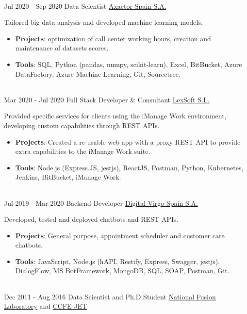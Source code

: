 \documentclass[letterpaper]{twentysecondcv} %
\begin{document}
\begin{twenty}
{\begin{itemize}
        \end{itemize}}
        \\
    \twentyitem
    	{Jul 2020 -}
		{Sep 2020}
        {Data Scientist}
        {\href{https://www.axactor.com/}{Axactor Spain S.A.}}
        {}
        {
        Tailored big data analysis and developed machine learning models.
        \begin{itemize}
            \item \textbf{Projects}: optimization of call center working hours, creation and maintenance of datasets scores.
            \item \textbf{Tools}: SQL, Python (pandas, numpy, scikit-learn), Excel, BitBucket, Azure DataFactory, Azure Machine Learning, Git, Sourcetree.
        \end{itemize}}
        \\
	\twentyitem
    	{Mar 2020 -}
		{Jul 2020}
        {Full Stack Developer \& Consultant}
        {\href{www.lex-soft.com}{LexSoft S.L.}}
        {}
        {
        {
        Provided specific services for clients using the iManage Work environment, developing custom capabilities through REST APIs.
        \begin{itemize}
            \item \textbf{Projects}: Created a re-usable web app with a proxy REST API to provide extra capabilities to the iManage Work suite.
            \item \textbf{Tools}: Node.js (Express.JS, jestjs), ReactJS, Postman, Python, Kubernetes, Jenkins, BitBucket, iManage Work. 
        \end{itemize}}
        }
    \\   
    \twentyitem
   		{Jul 2019 -}
		{Mar 2020}
        {Backend Developer}
        {\href{https://www.digitalvirgo.com/}{Digital Virgo Spain S.A.}}
        {}
        {
        {
        Developed, tested and deployed chatbots and REST APIs.
        \begin{itemize}
            \item \textbf{Projects}: General purpose, appointment scheduler and customer care chatbots.
            \item \textbf{Tools}: JavaScript, Node.js (hAPI, Restify, Express, Swagger, jestjs), DialogFlow, MS BotFramework, MongoDB, SQL, SOAP, Postman, Git.
        \end{itemize}}
        }
     \\
     \twentyitem
   		{Dec 2011 -}
		{Aug 2016}
        {Data Scientist and Ph.D Student}
        {\href{http://www.fusion.ciemat.es/home/}{National Fusion Laboratory} and \href{https://www.euro-fusion.org/devices/jet/}{CCFE-JET}}

\end{twenty}
\end{document}
